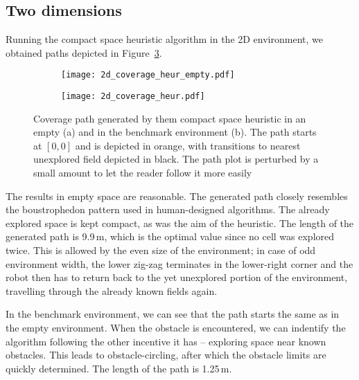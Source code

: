 \documentclass[buriama8_dp.tex]{subfiles}
\begin{document}
\subsection{Two dimensions}
\label{subsec:2d_sim}

Running the compact space heuristic algorithm in the 2D environment, we obtained paths depicted in Figure~\ref{fig:heur_2d_coverage}.

\begin{figure}[ht]
  \centering
  \begin{subfigure}[t]{0.49\textwidth}
    \texttt{[image: 2d\_coverage\_heur\_empty.pdf]}
    \caption{}
    \label{fig:heur_2d_empty}
  \end{subfigure}
  \begin{subfigure}[t]{0.49\textwidth}
    \texttt{[image: 2d\_coverage\_heur.pdf]}
    \caption{}
    \label{fig:heur_2d_env}
  \end{subfigure}
  
  \caption[Coverage path -- compact space heuristic in 2D]{Coverage path generated by them compact space heuristic in an empty (a) and in the benchmark environment (b). The path starts at \([0,0]\) and is depicted in orange, with transitions to nearest unexplored field depicted in black. The path plot is perturbed by a small amount to let the reader follow it more easily}
  \label{fig:heur_2d_coverage}
\end{figure}

The results in empty space are reasonable. The generated path closely resembles the boustrophedon pattern used in human-designed algorithms. The already explored space is kept compact, as was the aim of the heuristic. The length of the generated path is 9.9\,m, which is the optimal value since no cell was explored twice. This is allowed by the even size of the environment; in case of odd environment width, the lower zig-zag terminates in the lower-right corner and the robot then has to return back to the yet unexplored portion of the environment, travelling through the already known fields again.

In the benchmark environment, we can see that the path starts the same as in the empty environment. When the obstacle is encountered, we can indentify the algorithm following the other incentive it has -- exploring space near known obstacles. This leads to obstacle-circling, after which the obstacle limits are quickly determined. The length of the path is 1.25\,m. 
\end{document}
